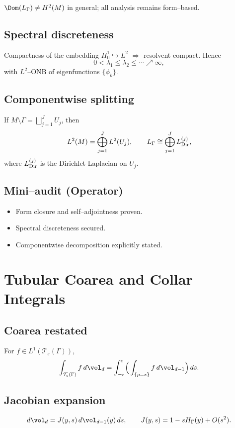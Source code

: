 \begin{remark}
$\Dom(L_\Gamma)\not=H^2(M)$ in general; all analysis remains form–based.
\end{remark}

\subsection{Spectral discreteness}
Compactness of the embedding $H^1_0\hookrightarrow L^2$ $\Rightarrow$ resolvent compact. Hence
\[
0<\lambda_1\le \lambda_2\le \cdots\nearrow\infty,
\]
with $L^2$–ONB of eigenfunctions $\{\phi_k\}$.

\subsection{Componentwise splitting}
If $M\setminus\Gamma=\bigsqcup_{j=1}^J U_j$, then
\[
L^2(M)=\bigoplus_{j=1}^J L^2(U_j),\qquad
L_\Gamma \cong \bigoplus_{j=1}^J L^{(j)}_{\rm Dir},
\]
where $L^{(j)}_{\rm Dir}$ is the Dirichlet Laplacian on $U_j$.

\subsection*{Mini–audit (Operator)}
\begin{itemize}
  \item Form closure and self–adjointness proven.
  \item Spectral discreteness secured.
  \item Componentwise decomposition explicitly stated.
\end{itemize}

\section{Tubular Coarea and Collar Integrals}
\label{sec:tubular-coarea}

\subsection{Coarea restated}
For $f\in L^1(\mathcal T_\varepsilon(\Gamma))$,
\[
\int_{\mathcal T_\varepsilon(\Gamma)} f\,d\vol_d
=\int_{-\varepsilon}^\varepsilon \!\Big(\int_{\{\rho=s\}} f\,d\vol_{d-1}\Big)\,ds.
\]

\subsection{Jacobian expansion}
\[
d\vol_d=J(y,s)\,d\vol_{d-1}(y)\,ds,\qquad J(y,s)=1-sH_\Gamma(y)+O(s^2).
\]

